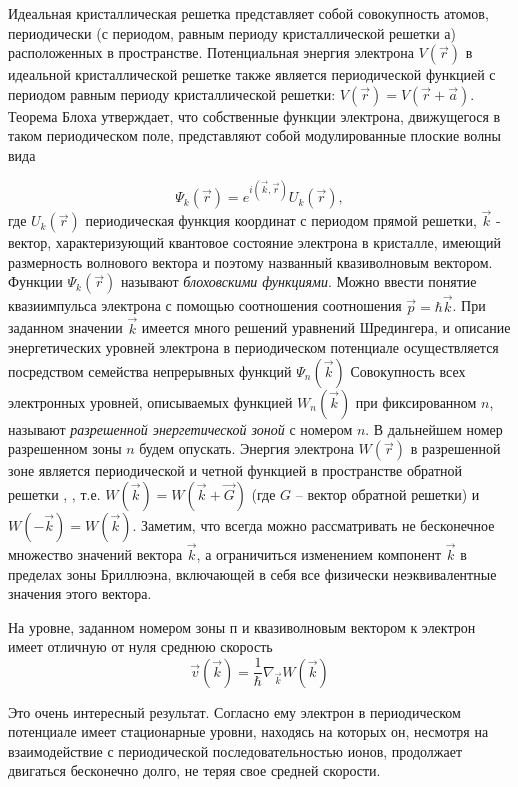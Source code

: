 Идеальная кристаллическая решетка представляет собой совокупность
атомов, периодически (с периодом, равным периоду кристаллической решетки
а) расположенных в пространстве. Потенциальная энергия электрона $V(\vec r)$ в
идеальной кристаллической решетке также является периодической функцией с
периодом равным периоду кристаллической решетки: $V(\vec r)=V(\vec r + \vec a)$. Теорема
Блоха утверждает, что собственные функции электрона, движущегося в таком
периодическом поле, представляют собой модулированные плоские волны вида

\begin{equation}
	\Psi_k (\vec r)= e^{i(\vec k, \vec r)} U_k(\vec r), 
\end{equation}
где $U_k(\vec r)$ периодическая функция координат с периодом прямой решетки, $\vec k$
- вектор, характеризующий квантовое состояние электрона в кристалле, имеющий размерность волнового вектора и поэтому названный квазиволновым вектором. Функции $\Psi_k(\vec r)$ называют \textit{блоховскими функциями}. Можно ввести понятие квазиимпульса электрона с помощью соотношения соотношения $\vec p = \hbar \vec k$. При заданном значении $\vec k$ имеется много решений уравнений Шредингера, и описание энергетических уровней электрона в периодическом потенциале осуществляется посредством семейства непрерывных функций $\Psi_n(\vec k)$ Совокупность всех электронных уровней, описываемых функцией $W_n(\vec k)$ при фиксированном $n$, называют \textit{разрешенной энергетической зоной} с номером $n$. В дальнейшем номер разрешенном
зоны $n$ будем опускать. Энергия электрона $W(\vec r)$ в разрешенной зоне является
периодической и четной функцией в пространстве обратной решетки \cite{lit1},\cite{lit2} , т.е.
$W(\vec k)= W(\vec k + \vec G)$  (где $G$ -- вектор обратной решетки) и 
$W(- \vec{k})=W(\vec k)$. Заметим, что всегда можно рассматривать не бесконечное множество значений вектора $\vec k$, а ограничиться изменением компонент $\vec k$  в пределах зоны Бриллюэна, включающей в себя все физически неэквивалентные значения этого вектора.

На уровне, заданном номером зоны п и квазиволновым вектором к электрон имеет отличную от нуля среднюю скорость
\begin{equation}
	\vec v (\vec k)= \frac{1}{\hbar} \nabla_{\vec k} W(\vec k)
\end{equation}

Это очень интересный результат. Согласно ему электрон в периодическом потенциале имеет стационарные уровни, находясь на которых он, несмотря на
взаимодействие с периодической последовательностью ионов, продолжает двигаться бесконечно долго, не теряя свое средней скорости.

